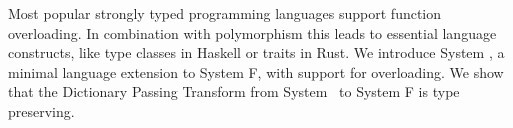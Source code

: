Most popular strongly typed programming languages support function overloading. 
In combination with polymorphism this leads to essential language constructs, like type classes in Haskell or traits in Rust.  
We introduce System \Fo, a minimal language extension to System F, with support for overloading.
We show that the Dictionary Passing Transform from System \Fo\ to System F is type preserving.